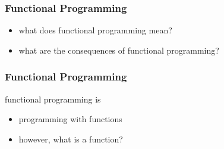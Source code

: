 \begin{frame}
\frametitle{Functional Programming}

\begin{itemize}
  \item what does functional programming mean?
  \item what are the consequences of functional programming?
\end{itemize}
\end{frame}

\begin{frame}
\frametitle{Functional Programming}
\begin{block}{functional programming is}
\begin{itemize}
  \item programming with functions
  \item however, what is a function?
\end{itemize}
\end{block}
\end{frame}
